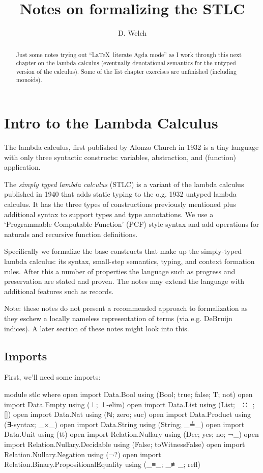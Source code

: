 \documentclass[runningheads]{llncs}
\begin{document}
\title{Notes on formalizing the STLC}
\author{D. Welch}
\institute{}
\maketitle

\begin{abstract}
Just some notes trying out ``\LaTeX \ literate Agda mode'' as I work through 
this next chapter on the lambda calculus (eventually denotational semantics for
the untyped version of the calculus). Some of the list chapter exercises are
unfinished (including monoids).
\end{abstract}

\section{Intro to the Lambda Calculus} 

The lambda calculus, first published by Alonzo Church in 1932 is a tiny language 
with only three syntactic constructs: variables, abstraction, and (function) 
application. 

The \textit{simply typed lambda calculus} (STLC) is a variant of the lambda 
calculus published in 1940 that adds static typing to the o.g. 1932 untyped 
lambda calculus. It has the three types of constructions previously mentioned 
plus additional syntax to support types and type annotations. We use a 
`Programmable Computable Function' (PCF) style syntax and add operations for 
naturals and recursive function definitions.

Specifically we formalize the base constructs that make up the 
simply-typed lambda calculus: its syntax, small-step semantics, typing, and 
context formation rules. After this a number of properties the language such 
as progress and preservation are stated and proven. The notes may extend the 
language with additional features such as records.

Note: these notes do not present a recommended approach to formalization as 
they eschew a locally nameless representation of terms (via e.g. DeBruijn 
indices). A later section of these notes might look into this. 

\subsection{Imports}

First, we'll need some imports:
\begin{code}
module stlc where 
open import Data.Bool using (Bool; true; false; T; not)
open import Data.Empty using (⊥; ⊥-elim)
open import Data.List using (List; _∷_; [])
open import Data.Nat using (ℕ; zero; suc)
open import Data.Product using (∃-syntax; _×_)
open import Data.String using (String; _≟_)
open import Data.Unit using (tt)
open import Relation.Nullary using (Dec; yes; no; ¬_)
open import Relation.Nullary.Decidable using (False; toWitnessFalse)
open import Relation.Nullary.Negation using (¬?)
open import Relation.Binary.PropositionalEquality using (_≡_; _≢_; refl)
\end{code}
\end{document}
